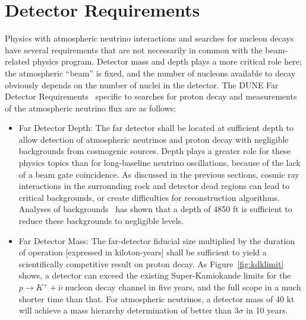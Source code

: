 \section{Detector Requirements}
\label{sec:physics-atmpdk-detector-requirements}

Physics with atmospheric neutrino interactions and searches for
nucleon decays have several requirements that are not necessarily in
common with the beam-related physics program.  Detector mass and depth plays a
more critical role here; the atmospheric ``beam'' is fixed, and the
number of nucleons available to decay obviously depends on the number
of nuclei in the detector.  The DUNE Far Detector
Requirements~\cite{lbnfdune-cdr-req} specific to searches for proton
decay and measurements of the atmospheric neutrino flux are as
follows:

\begin{itemize}

\item Far Detector Depth: The far detector shall be located at
  sufficient depth to allow detection of atmospheric neutrinos and
  proton decay with negligible backgrounds from cosmogenic sources.
  Depth plays a greater role for these physics topics than for
  long-baseline neutrino oscillations, because of the lack of a beam
  gate coincidence. As discussed in the previous sections, cosmic ray
  interactions in the surrounding rock and detector dead regions
  can lead to critical backgrounds, or create difficulties for
  reconstruction algorithms. Analyses of
  backgrounds~\cite{homestake:depth, Bueno:2007um, Klinger:2015kva, Adams:2013qkq} has
  shown that a depth of 4850 ft is sufficient to reduce these
  backgrounds to negligible levels.


\item Far Detector Mass: The far-detector fiducial size multiplied by
  the duration of operation [expressed in kiloton-years] shall be
  sufficient to yield a scientifically competitive result on proton
  decay. As Figure~\ref{fig:kdklimit} shows, a  detector can
  exceed the existing Super-Kamiokande limits for the $p\rightarrow
  K^+ + \bar{\nu}$ nucleon decay channel in five years, and the full  
  scope in a much shorter time than that.  For atmospheric neutrinos, a
  detector mass of 40 kt will achieve a mass hierarchy determination
  of better than 3$\sigma$ in 10 years.


\end{itemize}
